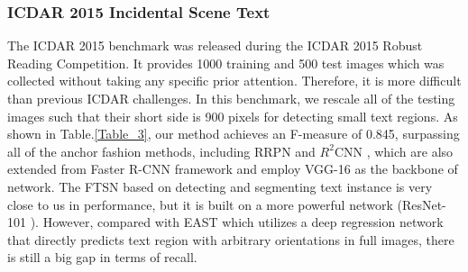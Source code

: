 \documentclass[3p, times]{elsarticle}
\begin{document}
\subsubsection{ICDAR 2015 Incidental Scene Text}

The ICDAR 2015 \cite{ICDAR2015} benchmark was released during the ICDAR 2015 Robust Reading Competition. It provides 1000 training and 500 test images which was collected without taking any specific prior attention. Therefore, it is more difficult than previous ICDAR challenges. In this benchmark, we rescale all of the testing images such that their short side is 900 pixels for detecting small text regions. As shown in Table.\ref{Table_3}, our method achieves an F-measure of 0.845, surpassing all of the anchor fashion methods, including RRPN \cite{RRPN2017ARXIV} and $R^2$CNN \cite{RRCNN2017ARXIV}, which are also extended from Faster R-CNN \cite{FASTERRCNN2015NIPS} framework and employ VGG-16 \cite{VGG2015ICLR} as the backbone of network. The FTSN \cite{FTSN2017ARXIV} based on detecting and segmenting text instance is very close to us in performance, but it is built on a more powerful network (ResNet-101 \cite{RESNET2016CVPR}). However, compared with EAST \cite{EAST2017CVPR} which utilizes a deep regression network that directly predicts text region with arbitrary orientations in full images, there is still a big gap in terms of recall.
\end{document}
